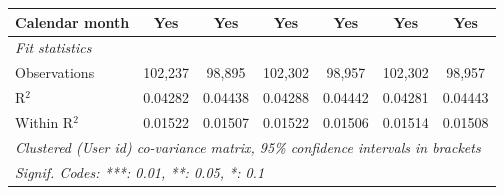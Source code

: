 \begin{table}[htbp]
\begin{threeparttable}[b]
\begin{tabular}{lcccccc}
         Calendar month                  & Yes                  & Yes                  & Yes                  & Yes                  & Yes                  & Yes\\  
         \midrule
         \emph{Fit statistics}\\
         Observations                    & 102,237              & 98,895               & 102,302              & 98,957               & 102,302              & 98,957\\  
         R$^2$                           & 0.04282              & 0.04438              & 0.04288              & 0.04442              & 0.04281              & 0.04443\\  
         Within R$^2$                    & 0.01522              & 0.01507              & 0.01522              & 0.01506              & 0.01514              & 0.01508\\  
         \midrule \midrule
         \multicolumn{7}{l}{\emph{Clustered (User id) co-variance matrix, 95\% confidence intervals in brackets}}\\
         \multicolumn{7}{l}{\emph{Signif. Codes: ***: 0.01, **: 0.05, *: 0.1}}\\
      \end{tabular}
   \end{threeparttable}
\end{table}



